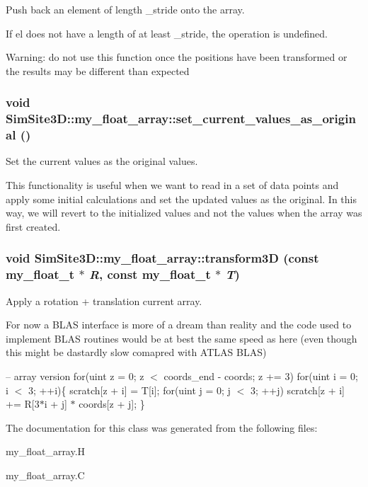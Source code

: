 Push back an element of length \_\-stride onto the array. 

If el does not have a length of at least \_\-stride, the operation is undefined.

Warning: do not use this function once the positions have been transformed or the results may be different than expected 
\subsubsection{\setlength{\rightskip}{0pt plus 5cm}void SimSite3D::my\_\-float\_\-array::set\_\-current\_\-values\_\-as\_\-original ()\hspace{0.3cm}{\tt  [inline]}}\label{classSimSite3D_1_1my__float__array_a98bd8a8f5970ca4cd7523e15a0af9f8}


Set the current values as the original values. 

This functionality is useful when we want to read in a set of data points and apply some initial calculations and set the updated values as the original. In this way, we will revert to the initialized values and not the values when the array was first created. 
\subsubsection{\setlength{\rightskip}{0pt plus 5cm}void SimSite3D::my\_\-float\_\-array::transform3D (const my\_\-float\_\-t $\ast$ {\em R}, const my\_\-float\_\-t $\ast$ {\em T})\hspace{0.3cm}{\tt  [inline]}}\label{classSimSite3D_1_1my__float__array_6539a83a54fe3c26d54f4bce4bfc7057}


Apply a rotation + translation current array. 

For now a BLAS interface is more of a dream than reality and the code used to implement BLAS routines would be at best the same speed as here (even though this might be dastardly slow comapred with ATLAS BLAS)

-- array version for(uint z = 0; z $<$ coords\_\-end - coords; z += 3) for(uint i = 0; i $<$ 3; ++i)\{ scratch[z + i] = T[i]; for(uint j = 0; j $<$ 3; ++j) scratch[z + i] += R[3$\ast$i + j] $\ast$ coords[z + j]; \} 

The documentation for this class was generated from the following files:\begin{CompactItemize}
\item 
my\_\-float\_\-array.H\item 
my\_\-float\_\-array.C\end{CompactItemize}
